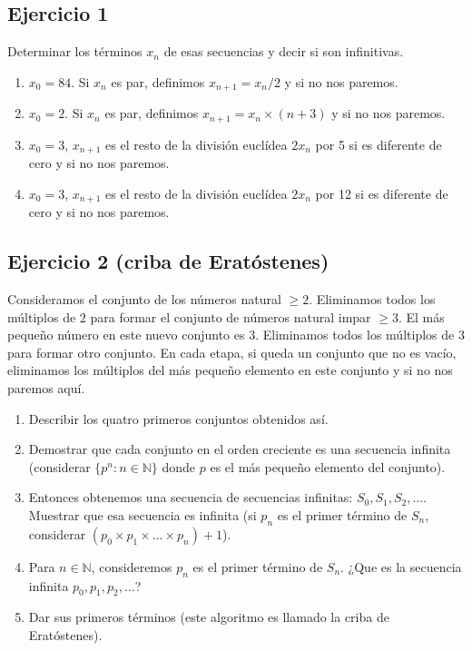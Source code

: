 \subsection*{Ejercicio 1}

Determinar los términos $x_n$ de esas secuencias y decir si son infinitivas.

\begin{enumerate}
\item $x_0 = 84$. Si $x_n$ es par, definimos $x_{n+1} = x_n / 2$ y si no nos
  paremos.
\item $x_0 = 2$. Si $x_n$ es par, definimos $x_{n+1} = x_n \times {(n+3)}$ y si
  no nos paremos.
\item $x_0 = 3$, $x_{n+1}$ es el resto de la división euclídea $2 x_n$ por 5 si
  es diferente de cero y si no nos paremos.
\item $x_0 = 3$, $x_{n+1}$ es el resto de la división euclídea $2 x_n$ por 12 si
  es diferente de cero y si no nos paremos.
\end{enumerate}

\subsection*{Ejercicio 2 (criba de Eratóstenes)}

Consideramos el conjunto de los números natural $\geq 2$. Eliminamos todos
los múltiplos de $2$ para formar el conjunto de números natural impar $\geq 3$.
El más pequeño número en este nuevo conjunto es $3$. Eliminamos todos
los múltiplos de $3$ para formar otro conjunto. En cada etapa, si queda un
conjunto que no es vacío, eliminamos los múltiplos del más pequeño elemento
en este conjunto y si no nos paremos aquí.

\begin{enumerate}
\item Describir los quatro primeros conjuntos obtenidos así.
\item Demostrar que cada conjunto en el orden creciente es una secuencia
  infinita (considerar $\{ p^n : n \in \mathbb N\}$ donde $p$ es el más
  pequeño elemento del conjunto).
\item Entonces obtenemos una secuencia de secuencias infinitas:
  $S_0, S_1, S_2, \ldots$. Muestrar que esa secuencia es infinita
  (si $p_n$ es el primer término de $S_n$, considerar
  $\left(p_0 \times p_1 \times \ldots \times p_n\right) + 1$).
\item Para $n \in \mathbb N$, consideremos $p_n$ es el primer término de $S_n$.
  ¿Que es la secuencia infinita $p_0, p_1, p_2, \ldots$?  
\item Dar sus primeros términos (este algoritmo es llamado la criba de
  Eratóstenes).
\end{enumerate}

